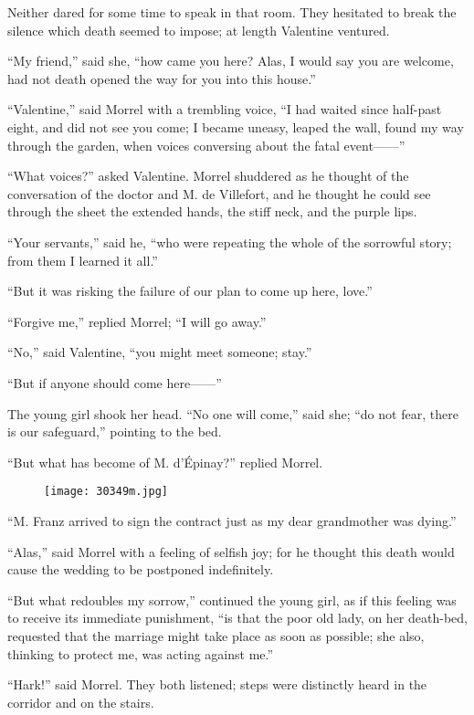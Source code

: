 Neither dared for some time to speak in that room. They hesitated to
break the silence which death seemed to impose; at length Valentine
ventured.

“My friend,” said she, “how came you here? Alas, I would say you are
welcome, had not death opened the way for you into this house.”

“Valentine,” said Morrel with a trembling voice, “I had waited since
half-past eight, and did not see you come; I became uneasy, leaped the
wall, found my way through the garden, when voices conversing about the
fatal event——”

“What voices?” asked Valentine. Morrel shuddered as he thought of the
conversation of the doctor and M. de Villefort, and he thought he could
see through the sheet the extended hands, the stiff neck, and the
purple lips.

“Your servants,” said he, “who were repeating the whole of the
sorrowful story; from them I learned it all.”

“But it was risking the failure of our plan to come up here, love.”

“Forgive me,” replied Morrel; “I will go away.”

“No,” said Valentine, “you might meet someone; stay.”

“But if anyone should come here——”

The young girl shook her head. “No one will come,” said she; “do not
fear, there is our safeguard,” pointing to the bed.

“But what has become of M. d’Épinay?” replied Morrel.

\begin{figure}[ht]
\texttt{[image: 30349m.jpg]}
\end{figure}

“M. Franz arrived to sign the contract just as my dear grandmother was
dying.”

“Alas,” said Morrel with a feeling of selfish joy; for he thought this
death would cause the wedding to be postponed indefinitely.

“But what redoubles my sorrow,” continued the young girl, as if this
feeling was to receive its immediate punishment, “is that the poor old
lady, on her death-bed, requested that the marriage might take place as
soon as possible; she also, thinking to protect me, was acting against
me.”

“Hark!” said Morrel. They both listened; steps were distinctly heard in
the corridor and on the stairs.

